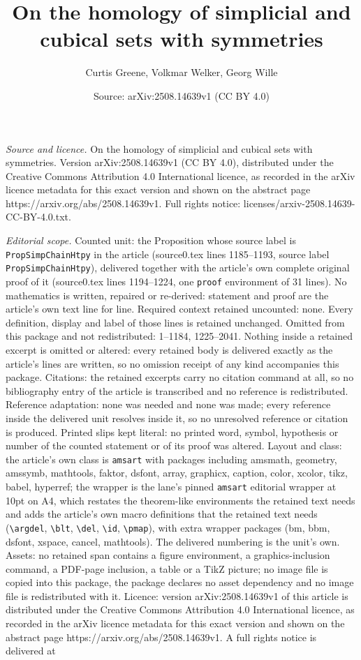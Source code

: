 \documentclass[10pt,a4paper]{amsart}
\title[On the homology of simplicial and cubical sets with symmetri]{On the homology of simplicial and cubical sets with symmetries}
\author{Curtis Greene, Volkmar Welker, Georg Wille}
\date{Source: arXiv:2508.14639v1 (CC BY 4.0)}
\begin{document}
\maketitle

\noindent\emph{Source and licence.} On the homology of simplicial and cubical sets with symmetries. Version arXiv:2508.14639v1 (CC BY 4.0), distributed under the Creative Commons Attribution 4.0 International licence, as recorded in the arXiv licence metadata for this exact version and shown on the abstract page https://arxiv.org/abs/2508.14639v1. Full rights notice: licenses/arxiv-2508.14639-CC-BY-4.0.txt.\par\smallskip

\noindent\textit{Editorial scope.} Counted unit: the Proposition whose source label is \texttt{PropSimpChainHtpy} in the article (source0.tex lines 1185--1193, source label \texttt{PropSimpChainHtpy}), delivered together with the article's own complete original proof of it (source0.tex lines 1194--1224, one \texttt{proof} environment of 31 lines). No mathematics is written, repaired or re-derived: statement and proof are the article's own text line for line. Required context retained uncounted: none. Every definition, display and label of those lines is retained unchanged. Omitted from this package and not redistributed: 1--1184, 1225--2041. Nothing inside a retained excerpt is omitted or altered: every retained body is delivered exactly as the article's lines are written, so no omission receipt of any kind accompanies this package. Citations: the retained excerpts carry no citation command at all, so no bibliography entry of the article is transcribed and no reference is redistributed. Reference adaptation: none was needed and none was made; every reference inside the delivered unit resolves inside it, so no unresolved reference or citation is produced. Printed slips kept literal: no printed word, symbol, hypothesis or number of the counted statement or of its proof was altered. Layout and class: the article's own class is \texttt{amsart} with packages including amsmath, geometry, amssymb, mathtools, faktor, dsfont, array, graphicx, caption, color, xcolor, tikz, babel, hyperref; the wrapper is the lane's pinned \texttt{amsart} editorial wrapper at 10pt on A4, which restates the theorem-like environments the retained text needs and adds the article's own macro definitions that the retained text needs (\texttt{\textbackslash argdel}, \texttt{\textbackslash blt}, \texttt{\textbackslash del}, \texttt{\textbackslash id}, \texttt{\textbackslash pmap}), with extra wrapper packages (bm, bbm, dsfont, xspace, cancel, mathtools). The delivered numbering is the unit's own. Assets: no retained span contains a figure environment, a graphics-inclusion command, a PDF-page inclusion, a table or a TikZ picture; no image file is copied into this package, the package declares no asset dependency and no image file is redistributed with it. Licence: version arXiv:2508.14639v1 of this article is distributed under the Creative Commons Attribution 4.0 International licence, as recorded in the arXiv licence metadata for this exact version and shown on the abstract page https://arxiv.org/abs/2508.14639v1. A full rights notice is delivered at 
\end{document}
